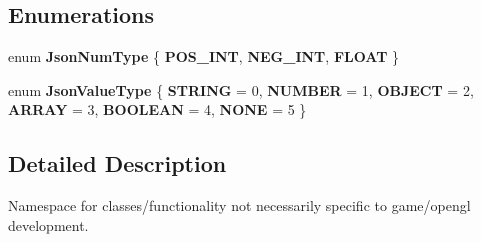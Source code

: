 \subsection*{Enumerations}
\begin{DoxyCompactItemize}
\item 
\mbox{\label{namespacenta_1_1utils_a83ee7c4cfccd9fa43564f5fe1c0c77d3}} 
enum {\bfseries Json\+Num\+Type} \{ {\bfseries P\+O\+S\+\_\+\+I\+NT}, 
{\bfseries N\+E\+G\+\_\+\+I\+NT}, 
{\bfseries F\+L\+O\+AT}
 \}
\item 
\mbox{\label{namespacenta_1_1utils_ac9921c0a3baf86d9facdc4927c66def3}} 
enum {\bfseries Json\+Value\+Type} \{ \newline
{\bfseries S\+T\+R\+I\+NG} = 0, 
{\bfseries N\+U\+M\+B\+ER} = 1, 
{\bfseries O\+B\+J\+E\+CT} = 2, 
{\bfseries A\+R\+R\+AY} = 3, 
\newline
{\bfseries B\+O\+O\+L\+E\+AN} = 4, 
{\bfseries N\+O\+NE} = 5
 \}
\end{DoxyCompactItemize}


\subsection{Detailed Description}
Namespace for classes/functionality not necessarily specific to game/opengl development. 